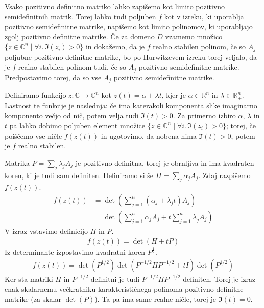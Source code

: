 \begin{dokaz}
    Vsako pozitivno definitno matriko lahko zapišemo kot limito pozitivno semidefinitnih matrik. Torej lahko tudi poljuben \(f\) kot v izreku, ki uporablja pozitivno semidefinitne matrike, napišemo kot limito polinomov, ki uporabljajo zgolj pozitivno definitne matrike. Če za domeno \(D\) vzamemo množico \(\{z\in \mathbb C^n \mid \forall i.\,\Im(z_i)>0\}\) in dokažemo, da je \(f\) realno stabilen polinom, če so \(A_j\) poljubne pozitivno definitne matrike, bo po Hurwitzevem izreku torej veljalo, da je \(f\) realno stabilen polinom tudi, če so \(A_j\) pozitivno semidefinitne matrike. Predpostavimo torej, da so vse \(A_j\) pozitivno semidefinitne matrike.
    
    Definiramo funkcijo \(z\colon \mathbb C\to \mathbb C^n\) kot \(z(t) = \alpha + \lambda t\), kjer je \(\alpha\in \mathbb R^n\) in \(\lambda \in \mathbb R_+^n\). Lastnost te funkcije je naslednja: če ima katerakoli komponenta slike imaginarno komponento večjo od nič, potem velja tudi \(\Im(t)>0\). Za primerno izbiro \(\alpha\), \(\lambda\) in \(t\) pa lahko dobimo poljuben element množice \(\{z\in \mathbb C^n \mid \forall i.\,\Im(z_i)>0\}\); torej, če poiščemo vse ničle \(f(z(t))\) in ugotovimo, da nobena nima \(\Im(t)>0\), potem je \(f\) realno stabilen.

    Matrika \(P = \sum_j \lambda_j A_j\) je pozitivno definitna, torej je obrnljiva in ima kvadraten koren, ki je tudi sam definiten. Definiramo si še \(H = \sum_j \alpha_j A_j\). Zdaj razpišemo \(f(z(t))\).
    \begin{align*}
        f(z(t)) & = \det\left(\sum_{j=1}^n (\alpha_j + \lambda_j t) A_j\right) \\
                & = \det\left(\sum_{j=1}^n \alpha_j A_j + t\sum_{j=1}^n \lambda_j A_j\right)
    \end{align*}
    V izraz vstavimo definicijo \(H\) in \(P\).
    \begin{align*}
        f(z(t))  = \det\left(H+ tP\right)
    \end{align*}
    Iz determinante izpostavimo kvadratni koren \(P^{\frac12}\).
    \begin{align*}
        f(z(t)) = \det\left(P^{1/2}\right)\det\left(P^{-1/2}HP^{-1/2} + tI\right) \det\left(P^{1/2}\right)
    \end{align*}
    Ker sta matriki \(H\) in \(P^{-1/2}\) definitni je tudi \(P^{-1/2}HP^{-1/2}\) definiten. Torej je izraz enak skalarnemu večkratniku karakterističnega polinoma pozitivno definitne matrike (za skalar \(\det(P)\)). Ta pa ima same realne ničle, torej je \(\Im(t)=0\).
\end{dokaz}

